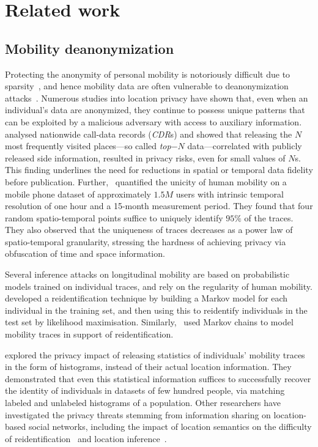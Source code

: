 \section{Related work}


\subsection{Mobility deanonymization}

Protecting the anonymity of personal mobility is notoriously difficult due to sparsity~\citep{aggarwal2008}, and hence mobility data are often vulnerable to deanonymization attacks~\citep{Narayanan2008}.
Numerous studies into location privacy have shown that, even when an individual's data are anonymized, they continue to possess unique patterns that can be exploited by a malicious adversary with access to auxiliary information.
 analysed nationwide call-data records (\emph{CDR}s) and showed that releasing the $N$ most frequently visited places---so called \emph{top$-N$} data---correlated with publicly released side information, resulted in privacy risks, even for small values of $N$s.
This finding underlines the need for reductions in spatial or temporal data fidelity before publication.
Further,~ quantified the unicity of human mobility on a mobile phone dataset of approximately $1.5M$ users with intrinsic temporal resolution of one hour and a 15-month measurement period.
They found that four random spatio-temporal points suffice to uniquely identify $ 95\% $ of the traces.
They also observed that the uniqueness of traces decreases as a power law of spatio-temporal granularity, stressing the hardness of achieving privacy via obfuscation of time and space information.

Several inference attacks on longitudinal mobility are based on probabilistic models trained on individual traces, and rely on the regularity of human mobility.
 developed a reidentification technique by building a Markov model for each individual in the training set, and then using this to reidentify individuals in the test set by likelihood maximisation.
Similarly,~ used Markov chains to model mobility traces in support of reidentification.

 explored the privacy impact of releasing statistics of individuals' mobility traces in the form of histograms, instead of their actual location information. They demonstrated that even this statistical information suffices to successfully recover the identity of individuals in datasets of few hundred people, via matching labeled and unlabeled histograms of a population.
Other researchers have investigated the privacy threats stemming from information sharing on location-based social networks, including the impact of location semantics on the difficulty of reidentification~\citep{privacyAndTheCity} and location inference~\citep{Agir}.

